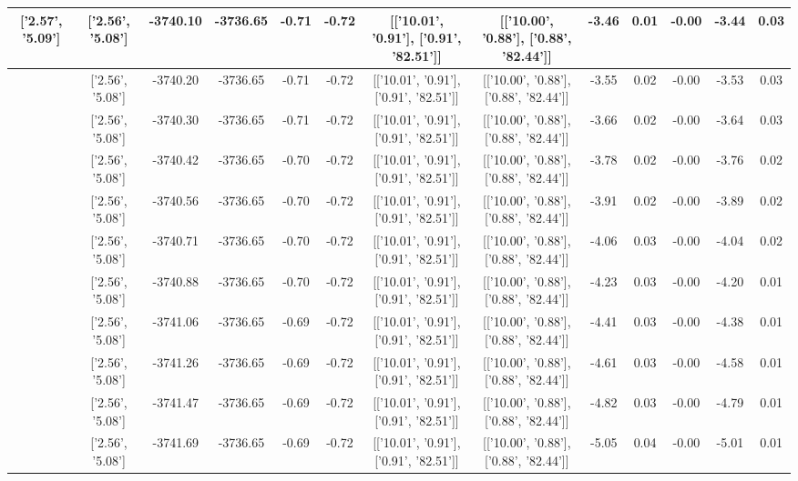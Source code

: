 \begin{table}[htbp]
\begin{adjustbox}{angle=90}
\begin{tabular}{|c|c|c|c|c|c|c|c|c|c|c|c|c|}
 ['2.57', '5.09'] & ['2.56', '5.08'] & -3740.10 & -3736.65 & -0.71 & -0.72 & [['10.01', '0.91'], ['0.91', '82.51']] & [['10.00', '0.88'], ['0.88', '82.44']] & -3.46 & 0.01 & -0.00 & -3.44 & 0.03\\ \hline
 ['2.57', '5.09'] & ['2.56', '5.08'] & -3740.20 & -3736.65 & -0.71 & -0.72 & [['10.01', '0.91'], ['0.91', '82.51']] & [['10.00', '0.88'], ['0.88', '82.44']] & -3.55 & 0.02 & -0.00 & -3.53 & 0.03\\ \hline
 ['2.57', '5.09'] & ['2.56', '5.08'] & -3740.30 & -3736.65 & -0.71 & -0.72 & [['10.01', '0.91'], ['0.91', '82.51']] & [['10.00', '0.88'], ['0.88', '82.44']] & -3.66 & 0.02 & -0.00 & -3.64 & 0.03\\ \hline
 ['2.57', '5.09'] & ['2.56', '5.08'] & -3740.42 & -3736.65 & -0.70 & -0.72 & [['10.01', '0.91'], ['0.91', '82.51']] & [['10.00', '0.88'], ['0.88', '82.44']] & -3.78 & 0.02 & -0.00 & -3.76 & 0.02\\ \hline
 ['2.57', '5.09'] & ['2.56', '5.08'] & -3740.56 & -3736.65 & -0.70 & -0.72 & [['10.01', '0.91'], ['0.91', '82.51']] & [['10.00', '0.88'], ['0.88', '82.44']] & -3.91 & 0.02 & -0.00 & -3.89 & 0.02\\ \hline
 ['2.58', '5.09'] & ['2.56', '5.08'] & -3740.71 & -3736.65 & -0.70 & -0.72 & [['10.01', '0.91'], ['0.91', '82.51']] & [['10.00', '0.88'], ['0.88', '82.44']] & -4.06 & 0.03 & -0.00 & -4.04 & 0.02\\ \hline
 ['2.58', '5.09'] & ['2.56', '5.08'] & -3740.88 & -3736.65 & -0.70 & -0.72 & [['10.01', '0.91'], ['0.91', '82.51']] & [['10.00', '0.88'], ['0.88', '82.44']] & -4.23 & 0.03 & -0.00 & -4.20 & 0.01\\ \hline
 ['2.58', '5.09'] & ['2.56', '5.08'] & -3741.06 & -3736.65 & -0.69 & -0.72 & [['10.01', '0.91'], ['0.91', '82.51']] & [['10.00', '0.88'], ['0.88', '82.44']] & -4.41 & 0.03 & -0.00 & -4.38 & 0.01\\ \hline
 ['2.58', '5.09'] & ['2.56', '5.08'] & -3741.26 & -3736.65 & -0.69 & -0.72 & [['10.01', '0.91'], ['0.91', '82.51']] & [['10.00', '0.88'], ['0.88', '82.44']] & -4.61 & 0.03 & -0.00 & -4.58 & 0.01\\ \hline
 ['2.58', '5.09'] & ['2.56', '5.08'] & -3741.47 & -3736.65 & -0.69 & -0.72 & [['10.01', '0.91'], ['0.91', '82.51']] & [['10.00', '0.88'], ['0.88', '82.44']] & -4.82 & 0.03 & -0.00 & -4.79 & 0.01\\ \hline
 ['2.58', '5.09'] & ['2.56', '5.08'] & -3741.69 & -3736.65 & -0.69 & -0.72 & [['10.01', '0.91'], ['0.91', '82.51']] & [['10.00', '0.88'], ['0.88', '82.44']] & -5.05 & 0.04 & -0.00 & -5.01 & 0.01\\ \hline

\end{tabular}
\end{adjustbox}
\end{table}
